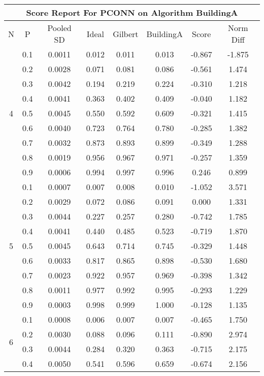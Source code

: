 \documentclass[11pt,a4paper]{report}
\begin{document}
\begin{longtable}{ | c | c || c | c | c | c | c | c | }
\hline
\multicolumn{8}{|c|}{ Score Report For PCONN on Algorithm BuildingA} \\
\hline
N & P & Pooled SD &  Ideal &  Gilbert & BuildingA  & Score & Norm Diff \\
 \hline
 \hline
 \endhead
\multirow{9}{*}{4} & 0.1 & 0.0011 & 0.012 & 0.011 & 0.013 & -0.867 & -1.875 \\
 & 0.2 & 0.0028 & 0.071 & 0.081 & 0.086 & -0.561 & 1.474 \\
 & 0.3 & 0.0042 & 0.194 & 0.219 & 0.224 & -0.310 & 1.218 \\
 & 0.4 & 0.0041 & 0.363 & 0.402 & 0.409 & -0.040 & 1.182 \\
 & 0.5 & 0.0045 & 0.550 & 0.592 & 0.609 & -0.321 & 1.415 \\
 & 0.6 & 0.0040 & 0.723 & 0.764 & 0.780 & -0.285 & 1.382 \\
 & 0.7 & 0.0032 & 0.873 & 0.893 & 0.899 & -0.349 & 1.288 \\
 & 0.8 & 0.0019 & 0.956 & 0.967 & 0.971 & -0.257 & 1.359 \\
 & 0.9 & 0.0006 & 0.994 & 0.997 & 0.996 & 0.246 & 0.899 \\
 \hline
\multirow{9}{*}{5} & 0.1 & 0.0007 & 0.007 & 0.008 & 0.010 & -1.052 & 3.571 \\
 & 0.2 & 0.0029 & 0.072 & 0.086 & 0.091 & 0.000 & 1.331 \\
 & 0.3 & 0.0044 & 0.227 & 0.257 & 0.280 & -0.742 & 1.785 \\
 & 0.4 & 0.0041 & 0.440 & 0.485 & 0.523 & -0.719 & 1.870 \\
 & 0.5 & 0.0045 & 0.643 & 0.714 & 0.745 & -0.329 & 1.448 \\
 & 0.6 & 0.0033 & 0.817 & 0.865 & 0.898 & -0.530 & 1.680 \\
 & 0.7 & 0.0023 & 0.922 & 0.957 & 0.969 & -0.398 & 1.342 \\
 & 0.8 & 0.0011 & 0.977 & 0.992 & 0.995 & -0.293 & 1.229 \\
 & 0.9 & 0.0003 & 0.998 & 0.999 & 1.000 & -0.128 & 1.135 \\
 \hline
\multirow{9}{*}{6} & 0.1 & 0.0008 & 0.006 & 0.007 & 0.007 & -0.465 & 1.750 \\
 & 0.2 & 0.0030 & 0.088 & 0.096 & 0.111 & -0.890 & 2.974 \\
 & 0.3 & 0.0044 & 0.284 & 0.320 & 0.363 & -0.715 & 2.175 \\
 & 0.4 & 0.0050 & 0.541 & 0.596 & 0.659 & -0.674 & 2.156 \\

\end{longtable}
\end{document}
